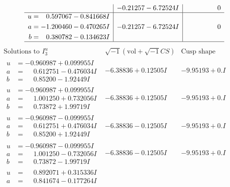 \documentclass[1p]{elsarticle_modified}
\theoremstyle{definition}
\newcommand{\I}{\sqrt{-1}}
\begin{document}
$$\begin{array}{c|c|c}
 & -0.21257 - 6.72524 I & \phantom{-0.000000 } 0 \\ \hline\begin{aligned}
u &= \phantom{-}0.597067 - 0.841668 I \\
a &= -1.200460 - 0.470265 I \\
b &= \phantom{-}0.380782 - 0.134623 I\end{aligned}
 & -0.21257 - 6.72524 I & \phantom{-0.000000 } 0\\
 \hline 
 \end{array}$$\newpage$$\begin{array}{c|c|c}  
\text{Solutions to }I^u_{3}& \I (\text{vol} + \sqrt{-1}CS) & \text{Cusp shape}\\
 \hline 
\begin{aligned}
u &= -0.960987 + 0.099955 I \\
a &= \phantom{-}0.612751 - 0.476034 I \\
b &= \phantom{-}0.85200 - 1.92449 I\end{aligned}
 & -6.38836 + 0.12505 I & -9.95193 + 0. I\phantom{ +0.000000I} \\ \hline\begin{aligned}
u &= -0.960987 + 0.099955 I \\
a &= \phantom{-}1.001250 + 0.732056 I \\
b &= \phantom{-}0.73872 + 1.99719 I\end{aligned}
 & -6.38836 + 0.12505 I & -9.95193 + 0. I\phantom{ +0.000000I} \\ \hline\begin{aligned}
u &= -0.960987 - 0.099955 I \\
a &= \phantom{-}0.612751 + 0.476034 I \\
b &= \phantom{-}0.85200 + 1.92449 I\end{aligned}
 & -6.38836 - 0.12505 I & -9.95193 + 0. I\phantom{ +0.000000I} \\ \hline\begin{aligned}
u &= -0.960987 - 0.099955 I \\
a &= \phantom{-}1.001250 - 0.732056 I \\
b &= \phantom{-}0.73872 - 1.99719 I\end{aligned}
 & -6.38836 - 0.12505 I & -9.95193 + 0. I\phantom{ +0.000000I} \\ \hline\begin{aligned}
u &= \phantom{-}0.892071 + 0.315336 I \\
a &= \phantom{-}0.841674 - 0.177264 I \\

\end{aligned}
\end{array}$$
\end{document}
